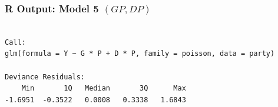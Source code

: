 \documentclass[oneside]{book}\usepackage[]{graphicx}\usepackage[svgnames]{xcolor}
\makeatletter
\newenvironment{kframe}{%
 \def\at@end@of@kframe{}%
 \ifinner\ifhmode%
  \def\at@end@of@kframe{\end{minipage}}%
  \begin{minipage}{\columnwidth}%
 \fi\fi%
 \def\FrameCommand##1{\hskip\@totalleftmargin \hskip-\fboxsep
 \colorbox{shadecolor}{##1}\hskip-\fboxsep
     \hskip-\linewidth \hskip-\@totalleftmargin \hskip\columnwidth}%
 \MakeFramed {\advance\hsize-\width
   \@totalleftmargin\z@ \linewidth\hsize
   \@setminipage}}%
 {\par\unskip\endMakeFramed%
 \at@end@of@kframe}
\newenvironment{knitrout}{}{} %
\makeatother
\begin{document}
\subsubsection*{R Output: Model 5 $(GP, DP)$}

\begin{knitrout}
\color{fgcolor}\begin{kframe}
\begin{verbatim}

Call:
glm(formula = Y ~ G * P + D * P, family = poisson, data = party)

Deviance Residuals: 
    Min       1Q   Median       3Q      Max  
-1.6951  -0.3522   0.0008   0.3338   1.6843  


\end{verbatim}
\end{kframe}
\end{knitrout}
\end{document}

